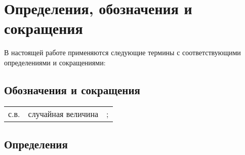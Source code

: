 \documentclass[utf8x, 14pt]{G7-32} %
\begin{document}
\frontmatter %

\maketitle %


\begin{executors}
\end{executors}

\tableofcontents %
 
\chapter{Определения, обозначения и сокращения}
В настоящей работе применяются следующие термины с соответствующими определениями и сокращениями:
\section{Обозначения и сокращения}
\begin{center}   
\begin{tabular}{ p{}  p{} p{} }
 с.в. & случайная величина  & ; \\ 
 \end{tabular}
 \end{center} 
 
 \section{Определения}
\end{document}
